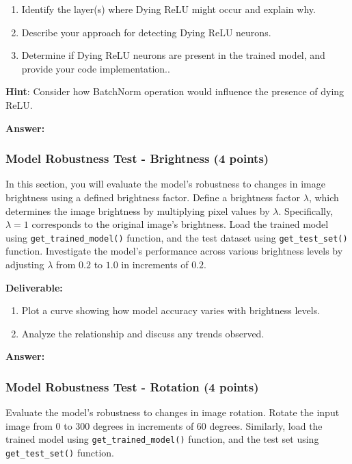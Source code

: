 \documentclass[11pt, oneside]{article}   	%
\begin{document}
\begin{enumerate}
    \item Identify the layer(s) where Dying ReLU might occur and explain why.
    \item Describe your approach for detecting Dying ReLU neurons. 
    \item Determine if Dying ReLU neurons are present in the trained model, and provide your code implementation..
\end{enumerate}
\textbf{Hint}: Consider how BatchNorm operation would influence the presence of dying ReLU.
    
\textbf{Answer:} \\

\subsubsection*{Model Robustness Test - Brightness (4 points)}
In this section, you will evaluate the model's robustness to changes in image brightness using a defined brightness factor.
Define a brightness factor $\lambda$, which determines the image brightness by multiplying pixel values by $\lambda$. Specifically, $\lambda = 1$ corresponds to the original image's brightness.
Load the trained model using \texttt{get\_trained\_model()} function, and the test dataset using \texttt{get\_test\_set()} function.  Investigate the model's performance across various brightness levels by adjusting $\lambda$ from $0.2$ to $1.0$ in increments of $0.2$. 

\noindent\textbf{Deliverable:}

\begin{enumerate}
    \item  Plot a curve showing how model accuracy varies with brightness levels.
    \item Analyze the relationship and discuss any trends observed.
\end{enumerate}


\textbf{Answer:} \\


\subsubsection*{Model Robustness Test - Rotation (4 points)}

Evaluate the model's robustness to changes in image rotation. Rotate the input image from $0$ to $300$ degrees in increments of $60$ degrees. 
Similarly, load the trained model using \texttt{get\_trained\_model()} function, and the test set using \texttt{get\_test\_set()} function. 
\end{document}
